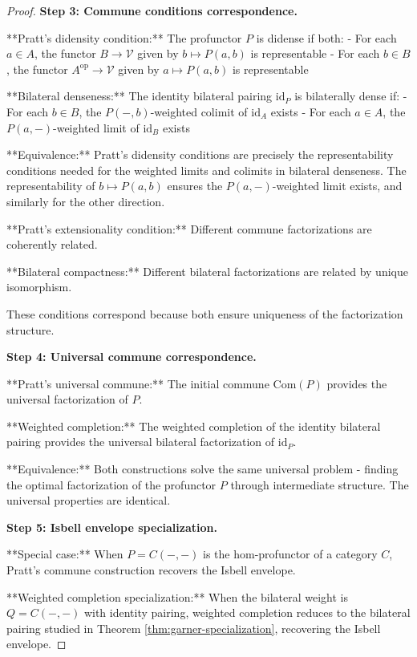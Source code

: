 \documentclass[11pt]{article}
\theoremstyle{plain}
\theoremstyle{definition}
\theoremstyle{remark}
\newcommand{\V}{\mathcal{V}}
\newcommand{\op}{\mathrm{op}}
\begin{document}
\begin{proof}
\textbf{Step 3: Commune conditions correspondence.}

**Pratt's didensity condition:** The profunctor $P$ is didense if both:
- For each $a \in A$, the functor $B \to \V$ given by $b \mapsto P(a, b)$ is representable
- For each $b \in B$, the functor $A^{\op} \to \V$ given by $a \mapsto P(a, b)$ is representable

**Bilateral denseness:** The identity bilateral pairing $\text{id}_P$ is bilaterally dense if:
- For each $b \in B$, the $P(-, b)$-weighted colimit of $\text{id}_A$ exists
- For each $a \in A$, the $P(a, -)$-weighted limit of $\text{id}_B$ exists

**Equivalence:** Pratt's didensity conditions are precisely the representability conditions needed for the weighted limits and colimits in bilateral denseness. The representability of $b \mapsto P(a, b)$ ensures the $P(a, -)$-weighted limit exists, and similarly for the other direction.

**Pratt's extensionality condition:** Different commune factorizations are coherently related.

**Bilateral compactness:** Different bilateral factorizations are related by unique isomorphism.

These conditions correspond because both ensure uniqueness of the factorization structure.

\textbf{Step 4: Universal commune correspondence.}

**Pratt's universal commune:** The initial commune $\text{Com}(P)$ provides the universal factorization of $P$.

**Weighted completion:** The weighted completion of the identity bilateral pairing provides the universal bilateral factorization of $\text{id}_P$.

**Equivalence:** Both constructions solve the same universal problem - finding the optimal factorization of the profunctor $P$ through intermediate structure. The universal properties are identical.

\textbf{Step 5: Isbell envelope specialization.}

**Special case:** When $P = C(-, -)$ is the hom-profunctor of a category $C$, Pratt's commune construction recovers the Isbell envelope.

**Weighted completion specialization:** When the bilateral weight is $Q = C(-, -)$ with identity pairing, weighted completion reduces to the bilateral pairing studied in Theorem \ref{thm:garner-specialization}, recovering the Isbell envelope.


\end{proof}
\end{document}
